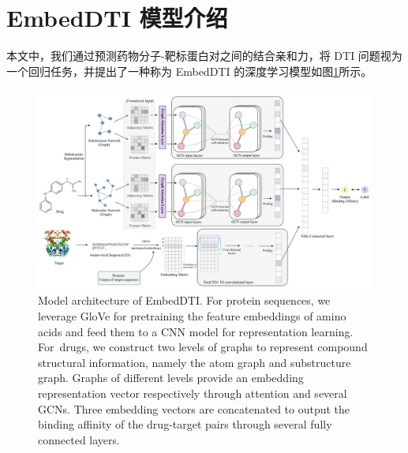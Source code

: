 \begin{table}[!htbp]
\centering
{}
\label{table:dti_datasets}
\end{table}

\section{EmbedDTI 模型介绍} \label{5.2}
本文中，我们通过预测药物分子-靶标蛋白对之间的结合亲和力，将 DTI 问题视为一个回归任务，并提出了一种称为 EmbedDTI 的深度学习模型如图\ref{fig:EmbedDTI}所示。

\begin{figure}[!htbp] 
\centering
\includegraphics[width=1\textwidth]  {imgs/model.png}
        {Model architecture of EmbedDTI. For protein sequences, we leverage GloVe for pretraining the feature embeddings of amino acids and feed them to a CNN model for representation learning. For~drugs, we construct two levels of graphs to represent compound structural information, namely the atom graph and substructure graph. Graphs of different levels provide an embedding representation vector respectively through attention and several GCNs. Three embedding vectors are concatenated to output the binding affinity of the drug-target pairs through several fully connected layers.}
\label{fig:EmbedDTI}
\end{figure}

